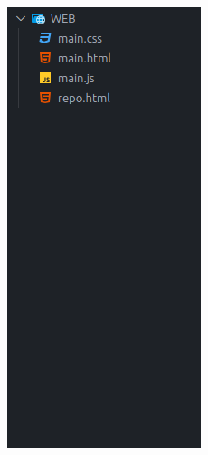 \documentclass[a4paper, 12pt]{book}
\begin{document}
\vspace{2em}
\begin{figure}[htbp]
  \centering
  \begin{minipage}[t]{0.35\textwidth}
    \centering
    \includegraphics[width=\textwidth, keepaspectratio]{img/tree_frontend_original.png}

\end{minipage}
\end{figure}
\end{document}
